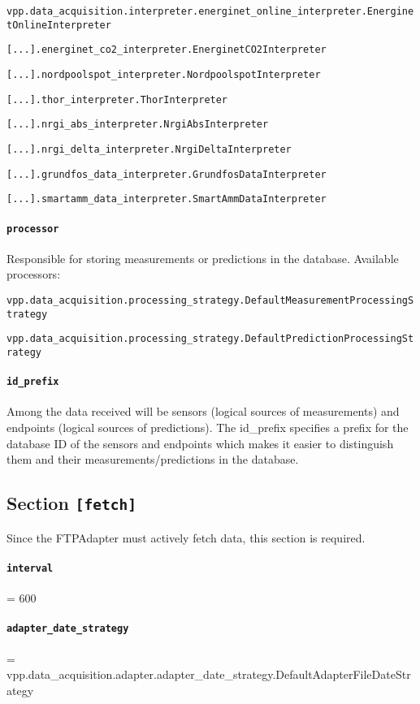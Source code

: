 {\texttt{vpp.data\_acquisition.interpreter.energinet\_online\_interpreter.EnerginetOnlineInterpreter}

\texttt{[...].energinet\_co2\_interpreter.EnerginetCO2Interpreter}

\texttt{[...].nordpoolspot\_interpreter.NordpoolspotInterpreter}

\texttt{[...].thor\_interpreter.ThorInterpreter}

\texttt{[...].nrgi\_abs\_interpreter.NrgiAbsInterpreter}

\texttt{[...].nrgi\_delta\_interpreter.NrgiDeltaInterpreter}

\texttt{[...].grundfos\_data\_interpreter.GrundfosDataInterpreter}

\texttt{[...].smartamm\_data\_interpreter.SmartAmmDataInterpreter}

\paragraph{\texttt{processor}} Responsible for storing measurements or predictions in the database. Available processors:

\texttt{vpp.data\_acquisition.processing\_strategy.DefaultMeasurementProcessingStrategy}

\texttt{vpp.data\_acquisition.processing\_strategy.DefaultPredictionProcessingStrategy}

\paragraph{\texttt{id\_prefix}} Among the data received will be sensors (logical sources of measurements) and endpoints (logical sources of predictions). The id\_prefix specifies a prefix for the database ID of the sensors and endpoints which makes it easier to distinguish them and their measurements/predictions in the database.

\subsection{Section \texttt{[fetch]}}
Since the FTPAdapter must actively fetch data, this section is required. 

\paragraph{\texttt{interval}} 
= 600

\paragraph{\texttt{adapter\_date\_strategy}} 
= vpp.data\_acquisition.adapter.adapter\_date\_strategy.DefaultAdapterFileDateStrategy



}
